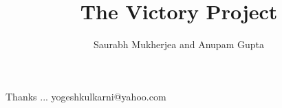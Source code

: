 \documentclass[xcolor=dvipsnames,compress,t,pdf,9pt]{beamer}
\title[Zen Habits \hspace{4cm} \insertframenumber /\inserttotalframenumber]
{The Victory Project}
\subtitle[]{Saurabh Mukherjea and Anupam Gupta}
\begin{document}
\begin{frame}
\titlepage
\end{frame}




\begin{frame}[c]{}
Thanks ...
\vspace{5mm}
yogeshkulkarni@yahoo.com
\end{frame}
\end{document}
